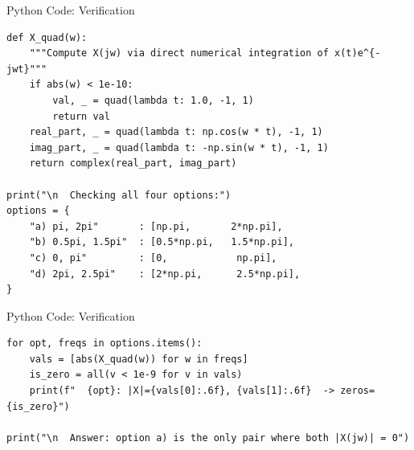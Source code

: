 \documentclass{beamer}
\begin{document}
\begin{frame}[fragile]{Python Code: Verification}


\begin{lstlisting}
def X_quad(w):
    """Compute X(jw) via direct numerical integration of x(t)e^{-jwt}"""
    if abs(w) < 1e-10:
        val, _ = quad(lambda t: 1.0, -1, 1)
        return val
    real_part, _ = quad(lambda t: np.cos(w * t), -1, 1)
    imag_part, _ = quad(lambda t: -np.sin(w * t), -1, 1)
    return complex(real_part, imag_part)

print("\n  Checking all four options:")
options = {
    "a) pi, 2pi"       : [np.pi,       2*np.pi],
    "b) 0.5pi, 1.5pi"  : [0.5*np.pi,   1.5*np.pi],
    "c) 0, pi"         : [0,            np.pi],
    "d) 2pi, 2.5pi"    : [2*np.pi,      2.5*np.pi],
} 

\end{lstlisting}
\end{frame}

\begin{frame}[fragile]{Python Code: Verification}


\begin{lstlisting}
for opt, freqs in options.items():
    vals = [abs(X_quad(w)) for w in freqs]
    is_zero = all(v < 1e-9 for v in vals)
    print(f"  {opt}: |X|={vals[0]:.6f}, {vals[1]:.6f}  -> zeros={is_zero}")

print("\n  Answer: option a) is the only pair where both |X(jw)| = 0")
\end{lstlisting}
\end{frame}
\end{document}
